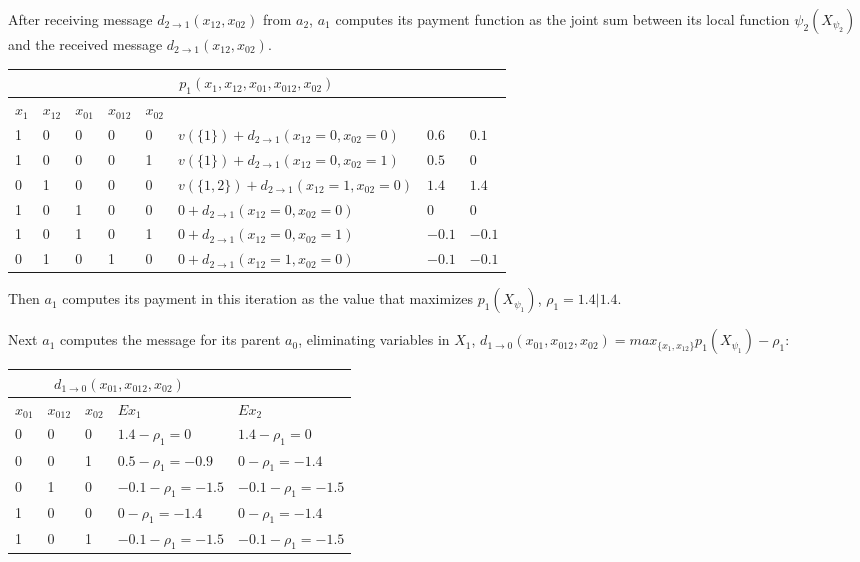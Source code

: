 \documentclass{article}
\begin{document}
\vspace{0.1in}\noindent After receiving message $d_{2\rightarrow
1}(x_{12},x_{02})$ from $a_2$, $a_1$ computes its payment function as the joint
sum between its local function $\psi_2(X_{\psi_2})$ and the received message
$d_{2\rightarrow 1}(x_{12},x_{02})$.


\noindent\begin{tabular}{ | l | l |  l | l | l | l |l | l |}
\multicolumn{8}{c}{$p_1(x_{1},x_{12},x_{01},x_{012},x_{02})$}  \\
\hline
	$x_{1}$ &	$x_{12}$ & $x_{01}$ & $x_{012}$ & $x_{02}$ &  & & \\
\hline
	1	 &		0	 &  0	&  0 & 0 & $v(\{1\}) + d_{2\rightarrow 1}(x_{12}=0,x_{02}=0)
	$ & $0.6$ & $0.1$\\
	1	 &		0	 &  0	&  0 & 1 & $v(\{1\}) + d_{2\rightarrow 1}(x_{12}=0,x_{02}=1)$ &
	$0.5$ & $0$ \\ 
	0	 &		1	 &	0 	&  0 & 0 &$v(\{1,2\})+ d_{2\rightarrow 1}(x_{12}=1,x_{02}=0)$&
	$1.4$& $1.4$\\ 
	1	 &		0	 &  1	&  0 & 0 & $0+ d_{2\rightarrow 1}(x_{12}=0,x_{02}=0)$ & $0$ &
	$0$\\ 
	1	 &		0	 &  1	&  0 & 1 & $0+ d_{2\rightarrow 1}(x_{12}=0,x_{02}=1)$ & $-0.1$ &
	$-0.1$\\ 
	0	 &		1	 &	0 	&  1 & 0 & $0+ d_{2\rightarrow 1}(x_{12}=1,x_{02}=0)$
	&$-0.1$ &$-0.1$\\
\hline
\end{tabular}

\vspace{0.1in}\noindent Then $a_1$ computes its payment in this iteration as the
value that maximizes $p_1(X_{\psi_1})$, $\rho_1 = 1.4\vert 1.4$.

\vspace{0.1in}\noindent Next $a_1$ computes the message for its parent $a_0$,
eliminating variables in $X_1$, $d_{1\rightarrow 0}(x_{01},x_{012},x_{02}) =
max_{\{x_{1},x_{12}\}} p_1(X_{\psi_1}) -\rho_1$:

\noindent\begin{tabular}{ | l | l |  l | l |l | }
\multicolumn{4}{c}{$d_{1\rightarrow 0}(x_{01},x_{012},x_{02})$}  \\
\hline
	 $x_{01}$ & $x_{012}$ & $x_{02}$ &   $Ex_1$& $Ex_2$ \\
\hline
	  0 &  0 & 0 &  $ 1.4-\rho_1 = 0$& $ 1.4-\rho_1 = 0$\\
	  0 & 0 & 1 &  $0.5-\rho_1 =-0.9$ & $0-\rho_1 =-1.4$\\
	  0 & 1 & 0 &   $-0.1-\rho_1  = -1.5$ &$-0.1-\rho_1  = -1.5$\\
	  1	&  0 & 0  & $0-\rho_1 =-1.4$ & $0-\rho_1 =-1.4$\\
	  1 & 0 & 1 & $-0.1-\rho_1 =-1.5$ & $-0.1-\rho_1 =-1.5$\\
\hline
\end{tabular}  
\end{document}
